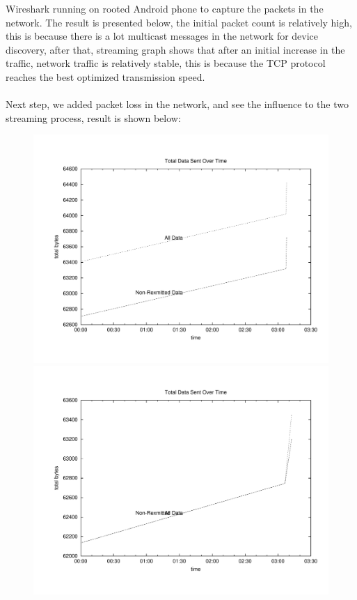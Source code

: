 Wireshark running on rooted Android phone to capture the packets in the network.
The result is presented below, the initial packet count is relatively high,
this is because there is a lot multicast messages in the network for device
discovery, after that, streaming graph shows that after an initial increase in
the traffic, network traffic is relatively stable, this is because the TCP
protocol reaches the best optimized transmission speed.\\
\\
Next step, we added packet loss in the network, and see the influence to the two
streaming process, result is shown below:
\begin{figure}[H]
\begin{minipage}[b]{0.45\linewidth}
\centering
\includegraphics[width=\textwidth]{charts/AirPlay_traffic_data}
\end{minipage}
\begin{minipage}[b]{0.45\linewidth}
\centering
\includegraphics[width=\textwidth]{charts/AirPlay_traffic_5loss_data}

\end{minipage}
\end{figure}
